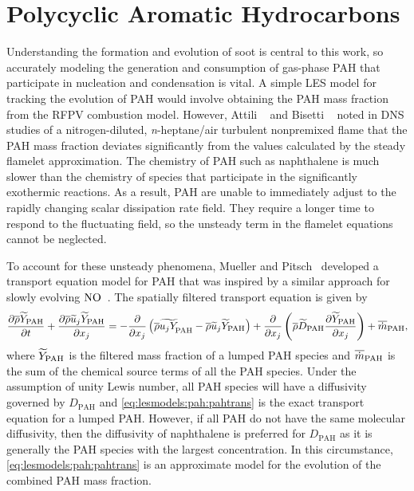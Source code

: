 \section{Polycyclic Aromatic Hydrocarbons}
\label{sec:lesmodels:pah}

Understanding the formation and evolution of soot is central to this work, so accurately modeling the generation and consumption of gas-phase PAH that participate in nucleation and condensation is vital. A simple LES model for tracking the evolution of PAH would involve obtaining the PAH mass fraction from the RFPV combustion model. However, Attili \etal~\cite{attili2014} and Bisetti \etal~\cite{bisetti2012} noted in DNS studies of a nitrogen-diluted, \textit{n}-heptane/air turbulent nonpremixed flame that the PAH mass fraction deviates significantly from the values calculated by the steady flamelet approximation. The chemistry of PAH such as naphthalene is much slower than the chemistry of species that participate in the significantly exothermic reactions. As a result, PAH are unable to immediately adjust to the rapidly changing scalar dissipation rate field. They require a longer time to respond to the fluctuating field, so the unsteady term in the flamelet equations cannot be neglected.

To account for these unsteady phenomena, Mueller and Pitsch~\cite{mueller2012} developed a transport equation model for PAH that was inspired by a similar approach for slowly evolving $\ce{NO}$~\cite{ihme2008}. The spatially filtered transport equation is given by
\begin{equation}\label{eq:lesmodels:pah:pahtrans}
  \ftrder{\tf{Y}_{\text{PAH}}} = -\dsff[\tf{Y}_{\text{PAH}}]{\tf{u_j Y}_{\hspace{-3pt}\text{PAH}}} + \fdt[\text{PAH}]{\tf{Y}_{\text{PAH}}} + \fst[m]{\text{PAH}},
\end{equation}
where $\tf{Y}_{\text{PAH}}$ is the filtered mass fraction of a lumped PAH species and $\fst[m]{\text{PAH}}$ is the sum of the chemical source terms of all the PAH species. Under the assumption of unity Lewis number, all PAH species will have a diffusivity governed by $D_{\text{PAH}}$ and \cref{eq:lesmodels:pah:pahtrans} is the exact transport equation for a lumped PAH. However, if all PAH do not have the same molecular diffusivity, then the diffusivity of naphthalene is preferred for $D_{\text{PAH}}$ as it is generally the PAH species with the largest concentration. In this circumstance, \cref{eq:lesmodels:pah:pahtrans} is an approximate model for the evolution of the combined PAH mass fraction.

